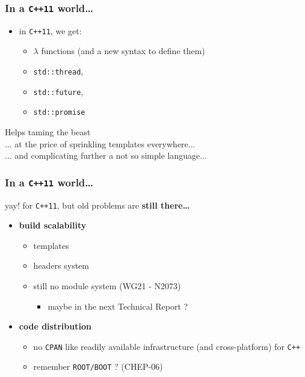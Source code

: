 \documentclass[bigger]{beamer}
\providecommand{\alert}[1]{\textbf{#1}}
\begin{document}
\begin{frame}
\frametitle{In a \verb~C++11~ world\ldots{}}
\label{sec-1-4}

\begin{itemize}
\item in \verb~C++11~, we get:
\begin{itemize}
\item $\lambda$ functions (and a new syntax to define them)
\item \verb~std::thread~,
\item \verb~std::future~,
\item \verb~std::promise~
\end{itemize}
\end{itemize}
\begin{block}{\quad}
\label{sec-1-4-1}

 \begin{center}
 Helps taming the beast \\
 ... at the price of sprinkling templates everywhere... \\
 ... and complicating further a not so simple language...
 \end{center}
\end{block}
\end{frame}
\begin{frame}
\frametitle{In a \verb~C++11~ world\ldots{}}
\label{sec-1-5}
\begin{block}{\quad}
\label{sec-1-5-1}

yay! for \verb~C++11~, but old problems are \alert{still there\ldots{}}
\end{block}
\quad
\label{sec-1-5-2}


\begin{itemize}
\item \alert{build scalability}
\begin{itemize}
\item templates
\item headers system
\item still no module system (WG21 - N2073)
\begin{itemize}
\item maybe in the next Technical Report ?
\end{itemize}
\end{itemize}
\end{itemize}

\vspace

\begin{itemize}
\item \alert{code distribution}
\begin{itemize}
\item no \verb~CPAN~ like readily available infrastructure (and cross-platform) for \verb~C++~
\item remember \verb~ROOT/BOOT~ ? (CHEP-06)
\end{itemize}
\end{itemize}
 
\end{frame}
\end{document}
